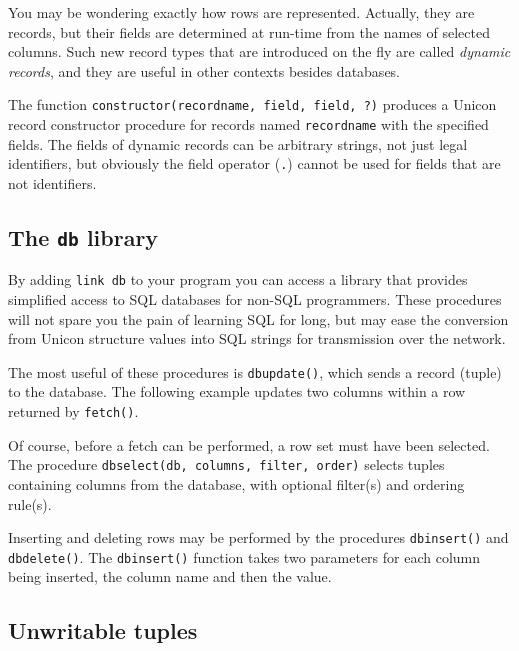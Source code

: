 You may be wondering exactly how rows are represented. Actually, they
are records, but their fields are determined at run-time from the names
of selected columns. Such new record types that are introduced on the
fly are called \textit{dynamic records}, and they are useful in other
contexts besides databases.

The function \texttt{constructor(recordname, field, field, ?)} produces a
Unicon record constructor procedure for records named
\texttt{recordname} with the specified fields. The fields of dynamic
records can be arbitrary strings, not just legal identifiers, but
obviously the field operator (\texttt{.}) cannot be used for fields
that are not identifiers.

\subsection{The \texttt{db} library}

By adding \texttt{link db} to your program you can access a library that
provides simplified access to SQL databases for non-SQL programmers.
These procedures will not spare you the pain of learning SQL for long,
but may ease the conversion from Unicon structure values into SQL
strings for transmission over the network.

The most useful of these procedures is \texttt{dbupdate()}, which sends
a record (tuple) to the database. The following example updates two
columns within a row returned by \texttt{fetch()}.


Of course, before a fetch can be performed, a row set must have been
selected. The procedure \texttt{dbselect(db, columns, filter, order)}
selects tuples containing columns from the database, with optional
filter(s) and ordering rule(s).

Inserting and deleting rows may be performed by the procedures
\texttt{dbinsert()} and \texttt{dbdelete()}. The \texttt{dbinsert()}
function takes two parameters for each column being inserted, the
column name and then the value.

\subsection{Unwritable tuples}

